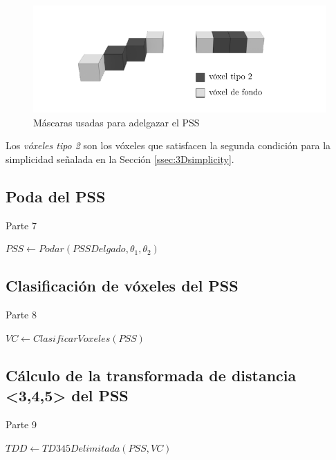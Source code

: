 \begin{figure}[H]\centering
\includegraphics[width=0.8\linewidth]{images/arcelli_directional_masks}
\caption{Máscaras usadas para adelgazar el PSS}
\label{fig:arcelli_directional_masks}
\end{figure}

Los \textit{vóxeles tipo 2} son los vóxeles que satisfacen la segunda condición para la simplicidad señalada en la Sección \ref{ssec:3Dsimplicity}.

\subsection{Poda del PSS} \label{ssec:prune1}

\begin{algorithm}[H]
\caption{Parte 7}
\begin{algorithmic}[1]
\State $PSS \gets Podar(PSSDelgado, \theta_1, \theta_2)$ \label{ddprune1}
\end{algorithmic}
\end{algorithm}

\subsection{Clasificación de vóxeles del PSS}

\begin{algorithm}[H]
\caption{Parte 8}
\begin{algorithmic}[1]
\State $VC \gets ClasificarVoxeles(PSS)$
\end{algorithmic}
\end{algorithm}

\subsection{Cálculo de la transformada de distancia <3,4,5> del PSS}

\begin{algorithm}[H]
\caption{Parte 9}
\begin{algorithmic}[1]
\State $TDD \gets TD345Delimitada(PSS, VC)$
\end{algorithmic}
\end{algorithm}


